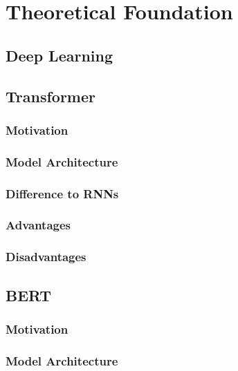 \chapter{Theoretical Foundation }\label{ch:theoretical-foundation}

\Blindtext


\section{Deep Learning}

\Blindtext


\section{Transformer}

\Blindtext

\subsection{Motivation}

\Blindtext

\subsection{Model Architecture}

\Blindtext

\subsection{Difference to RNNs}

\Blindtext

\subsection{Advantages}

\Blindtext

\subsection{Disadvantages}

\Blindtext


\section{BERT}

\Blindtext

\subsection{Motivation}

\Blindtext

\subsection{Model Architecture}

\Blindtext

